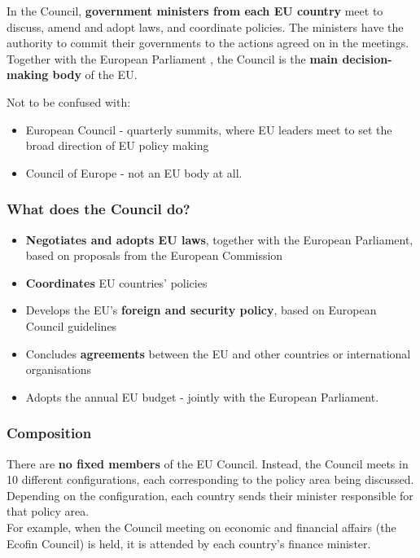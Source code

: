 In the Council, \textbf{government ministers from each EU country }meet to discuss, amend and adopt laws, and coordinate policies. The ministers have the authority to commit their governments to the actions agreed on in the meetings.
\\
Together with the European Parliament , the Council is the \textbf{main decision-making body} of the EU.

\clearpage
Not to be confused with:
\begin{itemize}
	\item European Council - quarterly summits, where EU leaders meet to set the broad direction of EU policy making
	\item Council of Europe - not an EU body at all.
\end{itemize}

\subsubsection{What does the Council do?}
\begin{itemize}
	\item \textbf{Negotiates and adopts EU laws}, together with the European Parliament, based on proposals from the European Commission
	\item \textbf{Coordinates} EU countries' policies
	\item Develops the EU's \textbf{foreign and security policy}, based on European Council guidelines
	\item Concludes \textbf{agreements} between the EU and other countries or international organisations
	\item Adopts the annual EU budget - jointly with the European Parliament.
\end{itemize}

\subsubsection{Composition}
There are \textbf{no fixed members }of the EU Council. Instead, the Council meets in 10 different configurations, each corresponding to the policy area being discussed. Depending on the configuration, each country sends their minister responsible for that policy area.
\\
For example, when the Council meeting on economic and financial affairs (the Ecofin Council) is held, it is attended by each country's finance minister.

